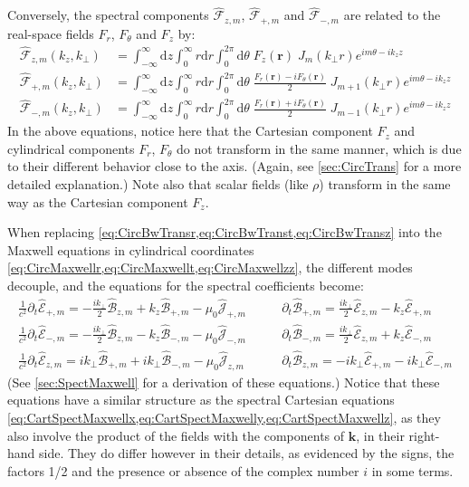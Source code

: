 \documentclass[1p,times,authoryear]{elsarticle}
\newcommand{\Integ}[1]{\int_{-\infty}^{\infty} \!\!\!\!\!\!
  \mathrm{d}#1}
\newcommand{\RInteg}[1]{\int_{0}^{\infty} \!\!\!\!\! #1\mathrm{d}#1}
\newcommand{\TInteg}[1]{\int_{0}^{2\pi} \!\!\!\!\!\! \mathrm{d}#1}
\renewcommand{\vec}[1]{\boldsymbol{#1}}
\newcommand{\spectral}[1]{\hat{\mathcal{#1}}}
\begin{document}
Conversely, the spectral components $\spectral{F}_{z,m}$, $\spectral{F}_{+,m}$ and
 $\spectral{F}_{-,m}$ are related to the real-space fields $F_r$,
 $F_\theta$ and $F_z$ by:
\begin{align}
\spectral{F}_{z,m}(k_z,k_\perp ) &= \Integ{z} \RInteg{r}
\TInteg{\theta} \;F_z(\vec{r})\; J_m(k_\perp r) e^{im\theta
 - i k_z z} \label{eq:CircFwTransz} \\
\spectral{F}_{+,m}(k_z,k_\perp ) &= \Integ{z} \RInteg{r}
\TInteg{\theta} \;\frac{F_r (\vec{r})-iF_\theta (\vec{r})}{2}\; J_{m+1}(k_\perp r) e^{im\theta
 - i k_z z} \label{eq:CircFwTransp} \\
\spectral{F}_{-,m}(k_z,k_\perp ) &= \Integ{z} \RInteg{r}
\TInteg{\theta} \;\frac{F_r (\vec{r})+iF_\theta(\vec{r})}{2}\; J_{m-1}(k_\perp r) e^{im\theta
 - i k_z z} \label{eq:CircFwTransm} 
\end{align}
\noindent In the above equations, notice here that the Cartesian
component $F_z$ and cylindrical components
$F_r$, $F_\theta$ do not transform in the same manner, which is due
to their different behavior close to the axis. (Again, see
\ref{sec:CircTrans} for a more detailed explanation.)
Note also that scalar fields (like $\rho$) transform in the
same way as the Cartesian component $F_z$. 

When replacing \cref{eq:CircBwTransr,eq:CircBwTranst,eq:CircBwTransz} into the Maxwell equations in cylindrical
coordinates \cref{eq:CircMaxwellr,eq:CircMaxwellt,eq:CircMaxwellzz},
the different modes decouple, and the equations for the spectral
coefficients become:
\begin{align}
\frac{1}{c^2}\partial_t \spectral{E}_{+,m} = - \frac{ik_\perp }{2}\spectral{B}_{z,m} + k_z\spectral{B}_{+,m} - \mu_0\spectral{J}_{+,m} \qquad &   
\partial_t \spectral{B}_{+,m} = \frac{ik_\perp }{2} \spectral{E}_{z,m} - k_z
\spectral{E}_{+,m} 
\label{eq:CircMaxwellp} \\
\frac{1}{c^2}\partial_t \spectral{E}_{-,m} = -\frac{ik_\perp }{2} \spectral{B}_{z,m} - k_z \spectral{B}_{-,m} - \mu_0  \spectral{J}_{-,m} \qquad &   
\partial_t \spectral{B}_{-,m} = \frac{ik_\perp }{2} \spectral{E}_{z,m} + k_z
\spectral{E}_{-,m} \label{eq:CircMaxwellm} \\
\frac{1}{c^2}\partial_t \spectral{E}_{z,m} = ik_\perp  \spectral{B}_{+,m} + ik_\perp \spectral{B}_{-,m}  - \mu_0 \spectral{J}_{z,m}  \qquad & 
\partial_t \spectral{B}_{z,m} = -ik_\perp  \spectral{E}_{+,m} - ik_\perp \spectral{E}_{-,m}  \label{eq:CircMaxwellz} 
\end{align}
(See \ref{sec:SpectMaxwell} for a derivation of these equations.)
Notice that these equations have a similar structure as the spectral
Cartesian equations \cref{eq:CartSpectMaxwellx,eq:CartSpectMaxwelly,eq:CartSpectMaxwellz}, as 
they also involve the product of the fields with the components of
$\vec{k}$, in their right-hand side. They do differ however in their
details, as evidenced by the signs, the factors 1/2 and the
presence or absence of the complex number $i$ in some terms.
\end{document}
